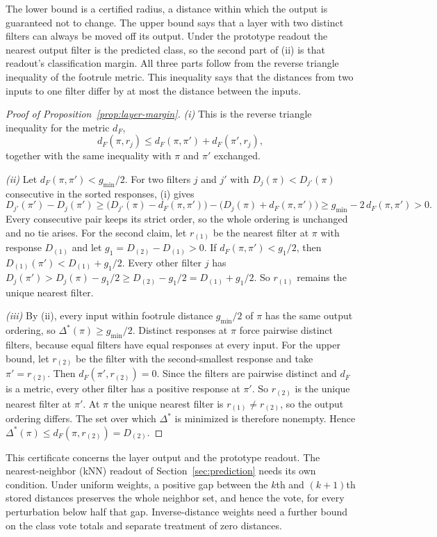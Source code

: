 The lower bound is a certified radius, a distance within which the output is guaranteed not to change. The upper bound says that a layer with two distinct filters can always be moved off its output. Under the prototype readout the nearest output filter is the predicted class, so the second part of (ii) is that readout's classification margin. All three parts follow from the reverse triangle inequality of the footrule metric. This inequality says that the distances from two inputs to one filter differ by at most the distance between the inputs.

\begin{proof}[Proof of Proposition~\ref{prop:layer-margin}]
\emph{(i)} This is the reverse triangle inequality for the metric $d_F$,
\[
d_F(\pi,r_j)\le d_F(\pi,\pi')+d_F(\pi',r_j),
\]
together with the same inequality with $\pi$ and $\pi'$ exchanged.

\emph{(ii)} Let $d_F(\pi,\pi')<g_{\min}/2$. For two filters $j$ and $j'$ with $D_j(\pi)<D_{j'}(\pi)$ consecutive in the sorted responses, (i) gives
\[
D_{j'}(\pi')-D_j(\pi')\ge\bigl(D_{j'}(\pi)-d_F(\pi,\pi')\bigr)-\bigl(D_j(\pi)+d_F(\pi,\pi')\bigr)\ge g_{\min}-2\,d_F(\pi,\pi')>0 .
\]
Every consecutive pair keeps its strict order, so the whole ordering is unchanged and no tie arises. For the second claim, let $r_{(1)}$ be the nearest filter at $\pi$ with response $D_{(1)}$ and let $g_1=D_{(2)}-D_{(1)}>0$. If $d_F(\pi,\pi')<g_1/2$, then $D_{(1)}(\pi')<D_{(1)}+g_1/2$. Every other filter $j$ has $D_j(\pi')>D_j(\pi)-g_1/2\ge D_{(2)}-g_1/2=D_{(1)}+g_1/2$. So $r_{(1)}$ remains the unique nearest filter.

\emph{(iii)} By (ii), every input within footrule distance $g_{\min}/2$ of $\pi$ has the same output ordering, so $\Delta^*(\pi)\ge g_{\min}/2$. Distinct responses at $\pi$ force pairwise distinct filters, because equal filters have equal responses at every input. For the upper bound, let $r_{(2)}$ be the filter with the second-smallest response and take $\pi'=r_{(2)}$. Then $d_F(\pi',r_{(2)})=0$. Since the filters are pairwise distinct and $d_F$ is a metric, every other filter has a positive response at $\pi'$. So $r_{(2)}$ is the unique nearest filter at $\pi'$. At $\pi$ the unique nearest filter is $r_{(1)}\neq r_{(2)}$, so the output ordering differs. The set over which $\Delta^*$ is minimized is therefore nonempty. Hence $\Delta^*(\pi)\le d_F(\pi,r_{(2)})=D_{(2)}$.
\end{proof}

This certificate concerns the layer output and the prototype readout. The nearest-neighbor (kNN) readout of Section~\ref{sec:prediction} needs its own condition. Under uniform weights, a positive gap between the $k$th and $(k+1)$th stored distances preserves the whole neighbor set, and hence the vote, for every perturbation below half that gap. Inverse-distance weights need a further bound on the class vote totals and separate treatment of zero distances.

